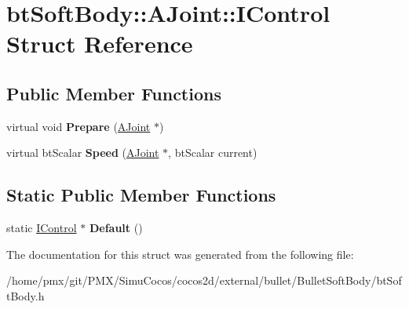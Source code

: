 \hypertarget{structbtSoftBody_1_1AJoint_1_1IControl}{}\section{bt\+Soft\+Body\+:\+:A\+Joint\+:\+:I\+Control Struct Reference}
\label{structbtSoftBody_1_1AJoint_1_1IControl}
\subsection*{Public Member Functions}
\begin{DoxyCompactItemize}
\item 
\mbox{\label{structbtSoftBody_1_1AJoint_1_1IControl_a9c58c5d6c02a9c491e7f6a64deacae77}} 
virtual void {\bfseries Prepare} (\hyperlink{structbtSoftBody_1_1AJoint}{A\+Joint} $\ast$)
\item 
\mbox{\label{structbtSoftBody_1_1AJoint_1_1IControl_a7b37f416825f2c72958c1d619f55e1c1}} 
virtual bt\+Scalar {\bfseries Speed} (\hyperlink{structbtSoftBody_1_1AJoint}{A\+Joint} $\ast$, bt\+Scalar current)
\end{DoxyCompactItemize}
\subsection*{Static Public Member Functions}
\begin{DoxyCompactItemize}
\item 
\mbox{\label{structbtSoftBody_1_1AJoint_1_1IControl_aeeea28d1c78df89a9a2fe0c20f66920e}} 
static \hyperlink{structbtSoftBody_1_1AJoint_1_1IControl}{I\+Control} $\ast$ {\bfseries Default} ()
\end{DoxyCompactItemize}


The documentation for this struct was generated from the following file\+:\begin{DoxyCompactItemize}
\item 
/home/pmx/git/\+P\+M\+X/\+Simu\+Cocos/cocos2d/external/bullet/\+Bullet\+Soft\+Body/bt\+Soft\+Body.\+h\end{DoxyCompactItemize}
